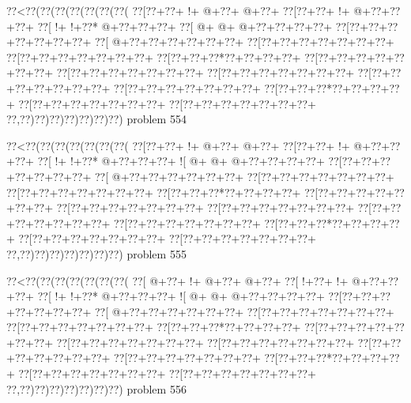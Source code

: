 \vbox{\vbox{\goo
\0??<\0??(\0??(\0??(\0??(\0??(\0??(\0??(
\0??[\0??+\0??+\- !+\- @+\0??+\- @+\0??+
\0??[\0??+\0??+\- !+\- @+\0??+\0??+\0??+
\0??[\- !+\- !+\0??*\- @+\0??+\0??+\0??+
\0??[\- @+\- @+\- @+\0??+\0??+\0??+\0??+
\0??[\0??+\0??+\0??+\0??+\0??+\0??+\0??+
\0??[\- @+\0??+\0??+\0??+\0??+\0??+\0??+
\0??[\0??+\0??+\0??+\0??+\0??+\0??+\0??+
\0??[\0??+\0??+\0??+\0??+\0??+\0??+\0??+
\0??[\0??+\0??+\0??*\0??+\0??+\0??+\0??+
\0??[\0??+\0??+\0??+\0??+\0??+\0??+\0??+
\0??[\0??+\0??+\0??+\0??+\0??+\0??+\0??+
\0??[\0??+\0??+\0??+\0??+\0??+\0??+\0??+
\0??[\0??+\0??+\0??+\0??+\0??+\0??+\0??+
\0??[\0??+\0??+\0??+\0??+\0??+\0??+\0??+
\0??[\0??+\0??+\0??*\0??+\0??+\0??+\0??+
\0??[\0??+\0??+\0??+\0??+\0??+\0??+\0??+
\0??[\0??+\0??+\0??+\0??+\0??+\0??+\0??+
\0??,\0??)\0??)\0??)\0??)\0??)\0??)\0??)
}
\hfil problem 554\hfil\break
}

\vbox{\vbox{\goo
\0??<\0??(\0??(\0??(\0??(\0??(\0??(\0??(
\0??[\0??+\0??+\- !+\- @+\0??+\- @+\0??+
\0??[\0??+\0??+\- !+\- @+\0??+\0??+\0??+
\0??[\- !+\- !+\0??*\- @+\0??+\0??+\0??+
\- ![\- @+\- @+\- @+\0??+\0??+\0??+\0??+
\0??[\0??+\0??+\0??+\0??+\0??+\0??+\0??+
\0??[\- @+\0??+\0??+\0??+\0??+\0??+\0??+
\0??[\0??+\0??+\0??+\0??+\0??+\0??+\0??+
\0??[\0??+\0??+\0??+\0??+\0??+\0??+\0??+
\0??[\0??+\0??+\0??*\0??+\0??+\0??+\0??+
\0??[\0??+\0??+\0??+\0??+\0??+\0??+\0??+
\0??[\0??+\0??+\0??+\0??+\0??+\0??+\0??+
\0??[\0??+\0??+\0??+\0??+\0??+\0??+\0??+
\0??[\0??+\0??+\0??+\0??+\0??+\0??+\0??+
\0??[\0??+\0??+\0??+\0??+\0??+\0??+\0??+
\0??[\0??+\0??+\0??*\0??+\0??+\0??+\0??+
\0??[\0??+\0??+\0??+\0??+\0??+\0??+\0??+
\0??[\0??+\0??+\0??+\0??+\0??+\0??+\0??+
\0??,\0??)\0??)\0??)\0??)\0??)\0??)\0??)
}
\hfil problem 555\hfil\break
}

\vbox{\vbox{\goo
\0??<\0??(\0??(\0??(\0??(\0??(\0??(\0??(
\0??[\- @+\0??+\- !+\- @+\0??+\- @+\0??+
\0??[\- !+\0??+\- !+\- @+\0??+\0??+\0??+
\0??[\- !+\- !+\0??*\- @+\0??+\0??+\0??+
\- ![\- @+\- @+\- @+\0??+\0??+\0??+\0??+
\0??[\0??+\0??+\0??+\0??+\0??+\0??+\0??+
\0??[\- @+\0??+\0??+\0??+\0??+\0??+\0??+
\0??[\0??+\0??+\0??+\0??+\0??+\0??+\0??+
\0??[\0??+\0??+\0??+\0??+\0??+\0??+\0??+
\0??[\0??+\0??+\0??*\0??+\0??+\0??+\0??+
\0??[\0??+\0??+\0??+\0??+\0??+\0??+\0??+
\0??[\0??+\0??+\0??+\0??+\0??+\0??+\0??+
\0??[\0??+\0??+\0??+\0??+\0??+\0??+\0??+
\0??[\0??+\0??+\0??+\0??+\0??+\0??+\0??+
\0??[\0??+\0??+\0??+\0??+\0??+\0??+\0??+
\0??[\0??+\0??+\0??*\0??+\0??+\0??+\0??+
\0??[\0??+\0??+\0??+\0??+\0??+\0??+\0??+
\0??[\0??+\0??+\0??+\0??+\0??+\0??+\0??+
\0??,\0??)\0??)\0??)\0??)\0??)\0??)\0??)
}
\hfil problem 556\hfil\break
}

